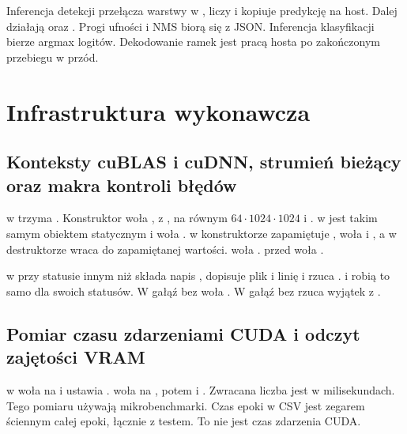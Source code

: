 Inferencja detekcji przełącza warstwy w , liczy  i kopiuje predykcję na host. Dalej działają  oraz . Progi ufności i NMS biorą się z JSON. Inferencja klasyfikacji bierze argmax logitów. Dekodowanie ramek jest pracą hosta po zakończonym przebiegu w przód.

\section{Infrastruktura wykonawcza}

\subsection{Konteksty cuBLAS i cuDNN, strumień bieżący oraz makra kontroli błędów}

 w  trzyma . Konstruktor woła ,  z ,  na  równym \(64 \cdot 1024 \cdot 1024\) i .  w  jest takim samym obiektem statycznym i woła .  w konstruktorze zapamiętuje , woła  i , a w destruktorze wraca do zapamiętanej wartości.  woła .  przed  woła .

 w  przy statusie innym niż  składa napis , dopisuje plik i linię i rzuca .  i  robią to samo dla swoich statusów. W  gałąź bez  woła . W  gałąź bez  rzuca wyjątek z .

\subsection{Pomiar czasu zdarzeniami CUDA i odczyt zajętości VRAM}

 w  woła  na  i ustawia .  woła  na , potem  i . Zwracana liczba jest w milisekundach. Tego pomiaru używają mikrobenchmarki. Czas epoki w CSV jest zegarem ściennym całej epoki, łącznie z testem. To nie jest czas zdarzenia CUDA.

